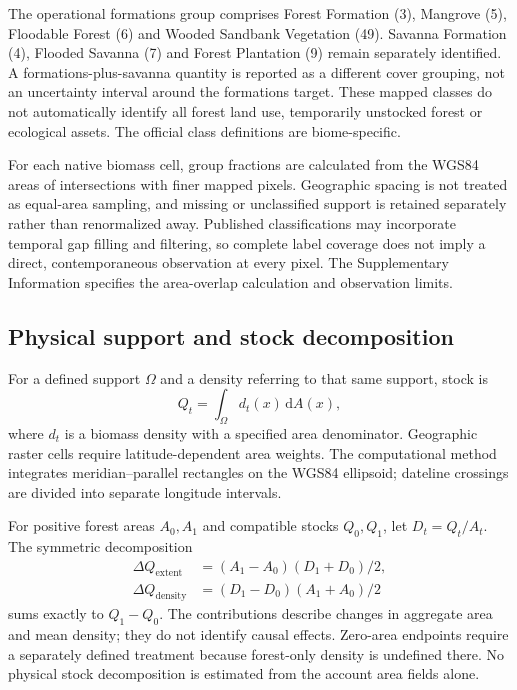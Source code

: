 \documentclass[11pt,a4paper]{article}
\begin{document}
The operational formations group comprises Forest Formation (3), Mangrove (5), Floodable Forest (6) and Wooded Sandbank Vegetation (49). Savanna Formation (4), Flooded Savanna (7) and Forest Plantation (9) remain separately identified. A formations-plus-savanna quantity is reported as a different cover grouping, not an uncertainty interval around the formations target. These mapped classes do not automatically identify all forest land use, temporarily unstocked forest or ecological assets. The official class definitions are biome-specific.

For each native biomass cell, group fractions are calculated from the WGS84 areas of intersections with finer mapped pixels. Geographic spacing is not treated as equal-area sampling, and missing or unclassified support is retained separately rather than renormalized away. Published classifications may incorporate temporal gap filling and filtering, so complete label coverage does not imply a direct, contemporaneous observation at every pixel. The Supplementary Information specifies the area-overlap calculation and observation limits.

\subsection{Physical support and stock decomposition}
For a defined support $\Omega$ and a density referring to that same support, stock is
\[
Q_t=\int_{\Omega} d_t(x)\,\mathrm dA(x),
\]
where $d_t$ is a biomass density with a specified area denominator. Geographic raster cells require latitude-dependent area weights. The computational method integrates meridian--parallel rectangles on the WGS84 ellipsoid; dateline crossings are divided into separate longitude intervals.

For positive forest areas $A_0,A_1$ and compatible stocks $Q_0,Q_1$, let $D_t=Q_t/A_t$. The symmetric decomposition
\begin{align}
\Delta Q_{\mathrm{extent}}&=(A_1-A_0)(D_1+D_0)/2,\label{eq:extent}\\
\Delta Q_{\mathrm{density}}&=(D_1-D_0)(A_1+A_0)/2\label{eq:density}
\end{align}
sums exactly to $Q_1-Q_0$. The contributions describe changes in aggregate area and mean density; they do not identify causal effects. Zero-area endpoints require a separately defined treatment because forest-only density is undefined there. No physical stock decomposition is estimated from the account area fields alone.
\end{document}
